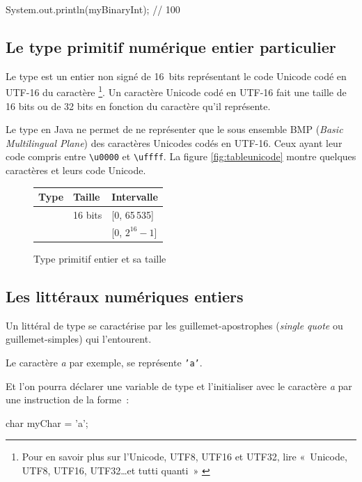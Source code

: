 \begin{java}
	System.out.println(myBinaryInt); // 100
\end{java}

\subsection{Le type primitif numérique entier particulier }

Le type  est un entier non signé de 16~bits représentant le code 
Unicode codé en UTF-16 du caractère
	\footnote{%
		Pour en savoir plus sur l'Unicode, UTF8, UTF16 et UTF32, lire
		«~Unicode, UTF8, UTF16, UTF32\ldots et tutti quanti~» \cite{pbt-unicode}
	}. 
Un caractère Unicode codé en UTF-16 fait une taille de 16 bits ou de 32 bits en
fonction du caractère qu'il représente. 

Le type  en Java ne permet de
ne représenter que le sous ensemble BMP (\textit{Basic Multilingual Plane}) des
caractères Unicodes codés en UTF-16. Ceux ayant leur code compris entre
\texttt{\textbackslash u0000} et \texttt{\textbackslash uffff}. La figure 
\vref{fig:tableunicode} montre quelques caractères et leurs code Unicode. 

\begin{figure}[h]
	\centering
	\begin{tabular}[h]{|l|l|p{9cm}|}
		\hline
		\rowcolor{black!20}
		\textbf{Type}	&	\textbf{Taille}	&	\textbf{Intervalle}	\\
		\hline
		\pc{char}	&	16 bits	&	[0, 65\,535]\\
		&			&	[$0$, $2^{16}-1$]\\
		\hline
	\end{tabular}	
	\caption{Type primitif entier  et sa taille}
	\label{fig:typeschar}
\end{figure}


\subsection{Les littéraux numériques entiers }

Un littéral de type  se caractérise par les guillemet-apostrophes
(\textit{single quote} ou guillemet-simples) qui l'entourent. 

Le caractère \textit{a} par exemple, se représente \texttt{'a'}. 

Et l'on pourra
déclarer une variable de type  et l'initialiser avec le caractère
\textit{a} par une instruction de la forme~:
\nopagebreak
\begin{java}
	char myChar = 'a';
\end{java}

